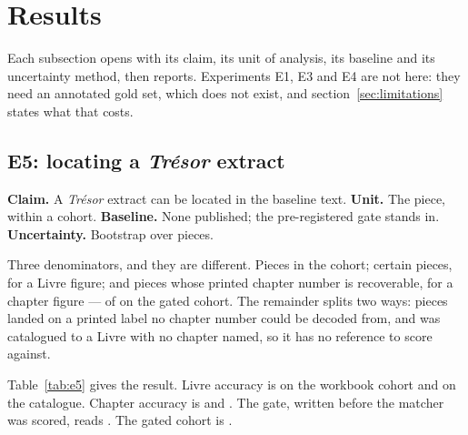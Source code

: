 %
\section{Results}
\label{sec:results}

Each subsection opens with its claim, its unit of analysis, its baseline and
its uncertainty method, then reports. Experiments E1, E3 and E4 are not here:
they need an annotated gold set, which does not exist, and
section~\ref{sec:limitations} states what that costs.

\subsection{E5: locating a \emph{Trésor} extract}
\label{sec:e5}

\textbf{Claim.} A \emph{Trésor} extract can be located in the baseline text.
\textbf{Unit.} The piece, within a cohort. \textbf{Baseline.} None published;
the pre-registered gate stands in. \textbf{Uncertainty.} Bootstrap over pieces.

\begin{table}[t]
  \centering
  
  \caption{E5, certain band only. The two cohorts are never pooled: the gate
    was pre-registered on the workbook batch when it was all that existed.}
  \label{tab:e5}
\end{table}

Three denominators, and they are different. Pieces in the cohort; certain
pieces, for a Livre figure; and pieces whose printed chapter number is
recoverable, for a chapter figure --- \locChapterScoreableWorkbook{} of \locPiecesWorkbook{} on the gated cohort.
The remainder splits two ways: \locChapterUnavailableWorkbook{} pieces landed
on a printed label no chapter number could be decoded from, and
\locChapterUnreferencedWorkbook{} was catalogued to a Livre with no chapter
named, so it has no reference to score against.

Table~\ref{tab:e5} gives the result. Livre accuracy is
\locLivreAccuracyWorkbook{} on the workbook cohort and
\locLivreAccuracyCatalogue{} on the catalogue. Chapter accuracy is
\locChapterAccuracyWorkbook{} and \locChapterAccuracyCatalogue{}. The gate, written before
the matcher was scored, reads . The gated cohort is
\locLivreAccuracyWorkbook{}.

